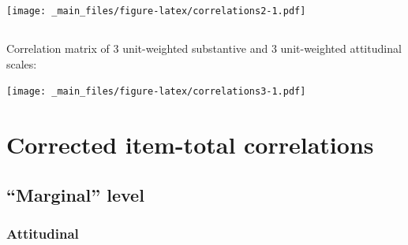 \documentclass[
]{book}
\begin{document}
\texttt{[image: \_main\_files/figure-latex/correlations2-1.pdf]}

\hypertarget{section}{%
\section*{}\label{section}}

Correlation matrix of 3 unit-weighted substantive and 3 unit-weighted attitudinal scales:

\texttt{[image: \_main\_files/figure-latex/correlations3-1.pdf]}

\hypertarget{rdrops}{%
\chapter{Corrected item-total correlations}\label{rdrops}}

\hypertarget{marginal-level}{%
\section{``Marginal'' level}\label{marginal-level}}

\hypertarget{attitudinal}{%
\subsection{Attitudinal}\label{attitudinal}}
\end{document}
